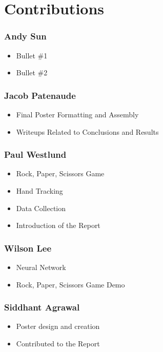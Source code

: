 \section{Contributions}

\subsubsection*{Andy Sun}
\begin{itemize}
\item Bullet \#1
\item Bullet \#2
\end{itemize}

\subsubsection*{Jacob Patenaude}
\begin{itemize}
\item Final Poster Formatting and Assembly
\item Writeups Related to Conclusions and Results
\end{itemize}

\subsubsection*{Paul Westlund}
\begin{itemize}
\item Rock, Paper, Scissors Game
\item Hand Tracking
\item Data Collection
\item Introduction of the Report
\end{itemize}

\subsubsection*{Wilson Lee}
\begin{itemize}
\item Neural Network
\item Rock, Paper, Scissors Game Demo
\end{itemize}

\subsubsection*{Siddhant Agrawal}
\begin{itemize}
\item Poster design and creation
\item Contributed to the Report
\end{itemize}
